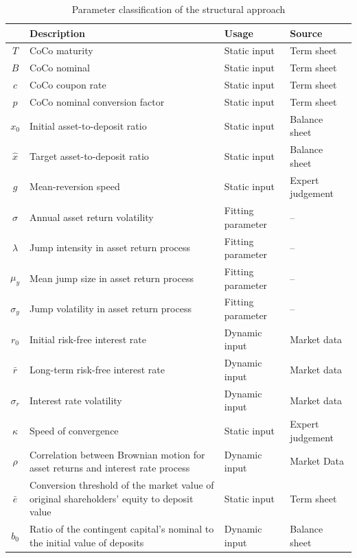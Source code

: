 \begin{table}[H]
	\setlength{\extrarowheight}{2.5pt}
	\centering
	\begin{tabular}{cp{8cm}ll}
		\toprule
			 & Description & Usage & Source \\
		\midrule
			$T$ & CoCo maturity & Static input & Term sheet\\
			$B$ & CoCo nominal & Static input & Term sheet \\
			$c$ & CoCo coupon rate & Static input & Term sheet\\ 
			$p$ & CoCo nominal conversion factor & Static input & Term sheet \\
			$x_0$ &Initial asset-to-deposit ratio & Static input & Balance sheet\\
			$\hat{x}$ & Target asset-to-deposit ratio & Static input & Balance sheet \\
			$g$ & Mean-reversion speed & Static input & Expert judgement  \\
			$\sigma$ & Annual asset return volatility & Fitting parameter & -- \\
			$\lambda$ & Jump intensity in asset return process & Fitting parameter  &  --  \\			
			$\mu_y$ & Mean jump size in asset return process & Fitting parameter & -- \\
			$\sigma_y$ & Jump volatility in asset return process & Fitting parameter & -- \\		
			$r_0$ & Initial risk-free interest rate & Dynamic input & Market data \\
			$\bar{r}$ & Long-term risk-free interest rate & Dynamic input & Market data\\
			$\sigma_r$ &Interest rate volatility & Dynamic input &  Market data \\
			$\kappa$ & Speed of convergence & Static input & Expert judgement \\
			$\rho$ & Correlation between Brownian motion for asset returns and interest rate process  & Dynamic input & Market Data \\ 
			$\bar{e}$ & Conversion threshold of the market value of original shareholders' equity to deposit value & Static input & Term sheet \\
			$b_0$ & Ratio of the contingent capital's nominal to the initial value of deposits & Dynamic input & Balance sheet \\
		\bottomrule
	\end{tabular}
	\caption[Parameter classification of the structural approach]{Parameter classification of the structural approach \citep{wilkens2014contingent}}
\end{table}

